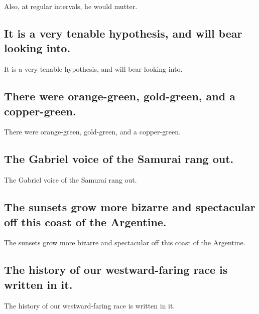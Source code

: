 \documentclass[]{article}
\begin{document}
Also, at regular intervals, he would mutter.

\hypertarget{it-is-a-very-tenable-hypothesis-and-will-bear-looking-into.}{%
\subsection{It is a very tenable hypothesis, and will bear looking
into.}\label{it-is-a-very-tenable-hypothesis-and-will-bear-looking-into.}}

It is a very tenable hypothesis, and will bear looking into.

\hypertarget{there-were-orange-green-gold-green-and-a-copper-green.}{%
\subsection{There were orange-green, gold-green, and a
copper-green.}\label{there-were-orange-green-gold-green-and-a-copper-green.}}

There were orange-green, gold-green, and a copper-green.

\hypertarget{the-gabriel-voice-of-the-samurai-rang-out.}{%
\subsection{The Gabriel voice of the Samurai rang
out.}\label{the-gabriel-voice-of-the-samurai-rang-out.}}

The Gabriel voice of the Samurai rang out.

\hypertarget{the-sunsets-grow-more-bizarre-and-spectacular-off-this-coast-of-the-argentine.}{%
\subsection{The sunsets grow more bizarre and spectacular off this coast
of the
Argentine.}\label{the-sunsets-grow-more-bizarre-and-spectacular-off-this-coast-of-the-argentine.}}

The sunsets grow more bizarre and spectacular off this coast of the
Argentine.

\hypertarget{the-history-of-our-westward-faring-race-is-written-in-it.}{%
\subsection{The history of our westward-faring race is written in
it.}\label{the-history-of-our-westward-faring-race-is-written-in-it.}}

The history of our westward-faring race is written in it.
\end{document}
